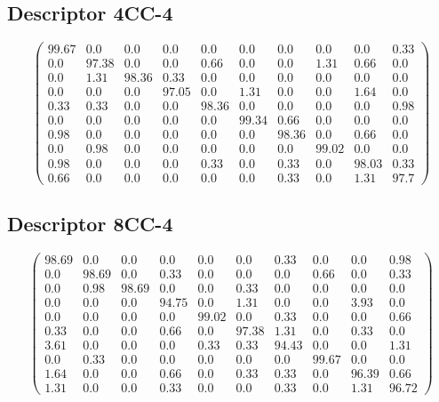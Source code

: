 \begin{appendices}
\subsection{Descriptor 4CC-4}
$$\begin{pmatrix}
99.67&0.0&0.0&0.0&0.0&0.0&0.0&0.0&0.0&0.33\\
0.0&97.38&0.0&0.0&0.66&0.0&0.0&1.31&0.66&0.0\\
0.0&1.31&98.36&0.33&0.0&0.0&0.0&0.0&0.0&0.0\\
0.0&0.0&0.0&97.05&0.0&1.31&0.0&0.0&1.64&0.0\\
0.33&0.33&0.0&0.0&98.36&0.0&0.0&0.0&0.0&0.98\\
0.0&0.0&0.0&0.0&0.0&99.34&0.66&0.0&0.0&0.0\\
0.98&0.0&0.0&0.0&0.0&0.0&98.36&0.0&0.66&0.0\\
0.0&0.98&0.0&0.0&0.0&0.0&0.0&99.02&0.0&0.0\\
0.98&0.0&0.0&0.0&0.33&0.0&0.33&0.0&98.03&0.33\\
0.66&0.0&0.0&0.0&0.0&0.0&0.33&0.0&1.31&97.7
\end{pmatrix}$$

\subsection{Descriptor 8CC-4}
$$\begin{pmatrix}
98.69&0.0&0.0&0.0&0.0&0.0&0.33&0.0&0.0&0.98\\
0.0&98.69&0.0&0.33&0.0&0.0&0.0&0.66&0.0&0.33\\
0.0&0.98&98.69&0.0&0.0&0.33&0.0&0.0&0.0&0.0\\
0.0&0.0&0.0&94.75&0.0&1.31&0.0&0.0&3.93&0.0\\
0.0&0.0&0.0&0.0&99.02&0.0&0.33&0.0&0.0&0.66\\
0.33&0.0&0.0&0.66&0.0&97.38&1.31&0.0&0.33&0.0\\
3.61&0.0&0.0&0.0&0.33&0.33&94.43&0.0&0.0&1.31\\
0.0&0.33&0.0&0.0&0.0&0.0&0.0&99.67&0.0&0.0\\
1.64&0.0&0.0&0.66&0.0&0.33&0.33&0.0&96.39&0.66\\
1.31&0.0&0.0&0.33&0.0&0.0&0.33&0.0&1.31&96.72
\end{pmatrix}$$


\end{appendices}
